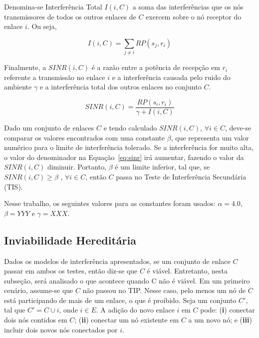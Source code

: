 Denomina-se Interferência Total $I(i,C)$ a soma das interferências que os nós transmissores de todos os outros enlaces de $C$ exercem sobre o nó receptor do enlace $i$. Ou seja,


\begin{equation}
I(i,C) = \sum_{j \neq i} RP(s_{j},r_{i})
\end{equation}


Finalmente, a $SINR(i,C)$ é a razão entre a potência de recepção em $r_{i}$ referente a transmissão no enlace $i$ e a interferência causada pelo ruido do ambiente $\gamma$ e a interferência total dos outros enlaces no conjunto $C$.


\begin{equation}
SINR(i,C) = \frac{RP(s_{i},r_{i})} {\gamma + I(i,C)}
\label{eq:sinr}  
\end{equation}


Dado um conjunto de enlaces $C$ e tendo calculado $SINR(i,C)$, $\forall i \in C$, deve-se comparar os valores encontrados com uma constante $\beta$, que representa um valor numérico para o limite de interferência tolerado. Se a interferência for muito alta, o valor do denominador na Equação~\ref{eq:sinr} irá aumentar, fazendo o valor da $SINR(i,C)$ diminuir. Portanto, $\beta$ é um limite inferior, tal que, se $SINR(i,C) \geq \beta$ , $\forall i \in C$, então $C$ passa no Teste de Interferência Secundária (TIS).

Nesse trabalho, os seguintes valores para as constantes foram usados: $\alpha = 4.0$, $\beta = YYY$ e $\gamma=XXX$.


\subsection{Inviabilidade Hereditária}

Dados os modelos de interferência apresentados, se um conjunto de enlace $C$ passar em ambos os testes, então diz-se que $C$ é viável. Entretanto, nesta subseção, será analisado o que acontece quando C não é viável.
    Em um primeiro cenário, assume-se que $C$ não passou no TIP. Nesse caso, pelo menos um nó de $C$ está participando de mais de um enlace, o que é proibido. Seja um conjunto $C'$, tal que $C' = C \cup {i}$, onde $i \in E$. A adição do novo enlace $i$ em $C$ pode: ({\bf i}) conectar dois nós contidos em $C$; ({\bf ii}) conectar um nó existente em $C$ a um novo nó; e ({\bf iii}) incluir dois novos nós conectados por $i$. 
  
